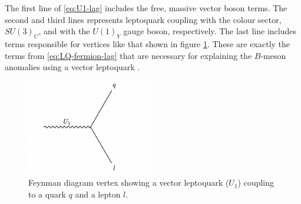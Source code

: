 The first line of \eqref{eq:U1-lag} includes the free, massive vector boson terms. The second and third lines represents leptoquark coupling with the colour sector, $SU(3)_C$, and with the $U(1)_Y$ gauge boson, respectively. The last line includes terms responsible for vertices like that shown in figure \ref{fig:vertex}. These are exactly the terms from \eqref{eq:LQ-fermion-lag} that are necessary for explaining the $B$-meson anomalies using a vector leptoquark \cite{baker_high_2019}.

\begin{figure}
    \centering
    \includegraphics[width = 0.5\textwidth]{images/lq-vertex.png}
    \caption{Feynman diagram vertex showing a vector leptoquark ($U_1$) coupling to a quark $q$ and a lepton $l$.}
    \label{fig:vertex}
\end{figure}


